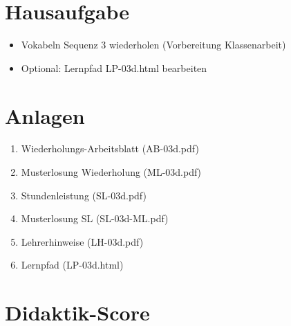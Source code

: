 \documentclass[11pt,a4paper]{article}
\begin{document}
\section{Hausaufgabe}

\begin{itemize}
    \item Vokabeln Sequenz 3 wiederholen (Vorbereitung Klassenarbeit)
    \item Optional: Lernpfad LP-03d.html bearbeiten
\end{itemize}

\section{Anlagen}

\begin{enumerate}
    \item Wiederholungs-Arbeitsblatt (AB-03d.pdf)
    \item Musterlosung Wiederholung (ML-03d.pdf)
    \item Stundenleistung (SL-03d.pdf)
    \item Musterlosung SL (SL-03d-ML.pdf)
    \item Lehrerhinweise (LH-03d.pdf)
    \item Lernpfad (LP-03d.html)
\end{enumerate}

\newpage
\section{Didaktik-Score}
\end{document}
